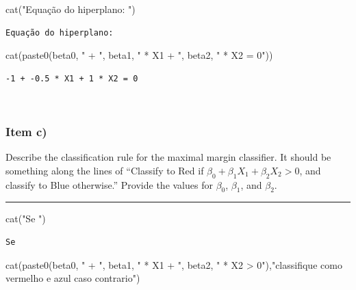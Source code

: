 \documentclass[
  a4paperpaper,
]{article}
\newenvironment{Shaded}{\begin{snugshade}}{\end{snugshade}}
\newcommand{\FunctionTok}[1]{\textcolor[rgb]{0.28,0.35,0.67}{#1}}
\newcommand{\NormalTok}[1]{\textcolor[rgb]{0.00,0.23,0.31}{#1}}
\newcommand{\StringTok}[1]{\textcolor[rgb]{0.13,0.47,0.30}{#1}}
\begin{document}
\begin{Shaded}
\begin{Highlighting}[]
\FunctionTok{cat}\NormalTok{(}\StringTok{"Equação do hiperplano: "}\NormalTok{)}
\end{Highlighting}
\end{Shaded}

\begin{verbatim}
Equação do hiperplano: 
\end{verbatim}

\begin{Shaded}
\begin{Highlighting}[]
\FunctionTok{cat}\NormalTok{(}\FunctionTok{paste0}\NormalTok{(beta0, }\StringTok{" + "}\NormalTok{, beta1, }\StringTok{" * X1 + "}\NormalTok{, beta2, }\StringTok{" * X2 = 0"}\NormalTok{))}
\end{Highlighting}
\end{Shaded}

\begin{verbatim}
-1 + -0.5 * X1 + 1 * X2 = 0
\end{verbatim}

~

\subsubsection{Item c)}\label{item-c-1}

Describe the classification rule for the maximal margin classifier. It
should be something along the lines of ``Classify to Red if
\(\beta_0 + \beta_1X_1 + \beta_2X_2 > 0\), and classify to Blue
otherwise.'' Provide the values for \(\beta_0\), \(\beta_1\), and
\(\beta_2\).

\begin{center}\rule{0.5\linewidth}{0.5pt}\end{center}

\begin{Shaded}
\begin{Highlighting}[]
\FunctionTok{cat}\NormalTok{(}\StringTok{"Se "}\NormalTok{)}
\end{Highlighting}
\end{Shaded}

\begin{verbatim}
Se 
\end{verbatim}

\begin{Shaded}
\begin{Highlighting}[]
\FunctionTok{cat}\NormalTok{(}\FunctionTok{paste0}\NormalTok{(beta0, }\StringTok{" + "}\NormalTok{, beta1, }\StringTok{" * X1 + "}\NormalTok{, beta2, }\StringTok{" * X2 \textgreater{} 0"}\NormalTok{),}\StringTok{"classifique como vermelho e azul caso contrario"}\NormalTok{)}
\end{Highlighting}
\end{Shaded}
\end{document}
